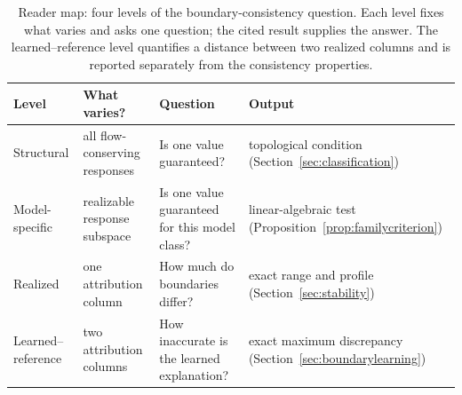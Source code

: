 \documentclass[a4paper,fleqn]{cas-sc}
\begin{document}
\begin{table}[pos=tb]
\footnotesize
\caption{Reader map: four levels of the boundary-consistency question.
Each level fixes what varies and asks one question; the cited result
supplies the answer. The learned--reference level quantifies a distance
between two realized columns and is reported separately from the
consistency properties.}
\label{tab:threequestions}
\begin{tabular*}{\tblwidth}{@{}p{3.0cm}p{3.9cm}p{4.3cm}p{3.3cm}@{}}
\toprule Level & What varies? & Question & Output\\\midrule
Structural & all flow-conserving responses & Is one value guaranteed? & topological condition (Section~\ref{sec:classification})\\
Model-specific & realizable response subspace & Is one value guaranteed for this model class? & linear-algebraic test (Proposition~\ref{prop:familycriterion})\\
Realized & one attribution column & How much do boundaries differ? & exact range and profile (Section~\ref{sec:stability})\\
Learned--reference & two attribution columns & How inaccurate is the learned explanation? & exact maximum discrepancy (Section~\ref{sec:boundarylearning})\\
\bottomrule\end{tabular*}\end{table}
\end{document}

